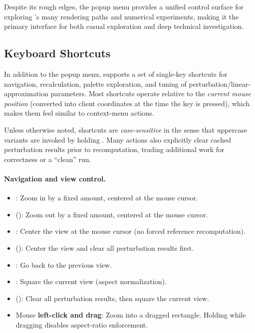 Despite its rough edges, the popup menu provides a unified control surface for
exploring \FractalShark{}’s many rendering paths and numerical experiments, making
it the primary interface for both casual exploration and deep technical
investigation.


\subsection{Keyboard Shortcuts}
\label{sec:keyboard-shortcuts}

In addition to the popup menu, \FractalShark{} supports a set of single-key
shortcuts for navigation, recalculation, palette exploration, and tuning of
perturbation/linear-approximation parameters.  Most shortcuts operate relative
to the \emph{current mouse position} (converted into client coordinates at the
time the key is pressed), which makes them feel similar to context-menu actions.

Unless otherwise noted, shortcuts are \emph{case-sensitive} in the sense that
uppercase variants are invoked by holding .  Many actions also
explicitly clear cached perturbation results prior to recomputation, trading
additional work for correctness or a ``clean'' run.

\paragraph{Navigation and view control.}
\begin{itemize}
  \item {}: Zoom in by a fixed amount, centered at the mouse cursor.
  \item {} (): Zoom out by a fixed amount, centered at the mouse cursor.
  \item {}: Center the view at the mouse cursor (no forced reference recomputation).
  \item {} (): Center the view and clear all perturbation results first.
  \item {}: Go back to the previous view.
  \item {}: Square the current view (aspect normalization).
  \item {} (): Clear all perturbation results, then square the current view.
  \item Mouse \textbf{left-click and drag}: Zoom into a dragged rectangle.
        Holding  while dragging disables aspect-ratio enforcement.
\end{itemize}

